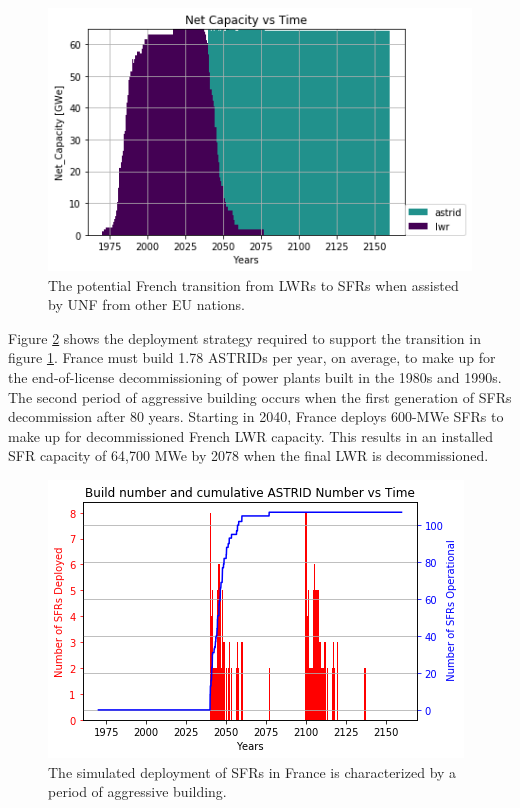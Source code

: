 \begin{figure}[htbp!]
        \begin{center}
                \includegraphics[scale=0.7]{./images/french-transition/power_plot.png}
        \end{center}
        \caption{The potential French transition from \glspl{LWR} to 
                \glspl{SFR} when assisted by \gls{UNF} from other \gls{EU} 
        nations.}
        \label{fig:sfr_num}
\end{figure}

Figure \ref{fig:french_dep} shows the deployment strategy required to support the transition in 
figure \ref{fig:sfr_num}. France must build 1.78 \glspl{ASTRID} per year, on average, to 
make up for the end-of-license decommissioning of power plants built in the 1980s and 1990s.
The second period of aggressive building occurs when the first generation of \glspl{SFR} decommission after 80 years.
Starting in 2040, France deploys 600-\gls{MWe} \glspl{SFR} to make up for 
decommissioned French \gls{LWR} capacity. This results in an installed 
\gls{SFR} 
capacity of 64,700 \gls{MWe} by 2078 when the final \gls{LWR} is 
decommissioned. 



\begin{figure}[htbp!]
    \begin{center}
        \includegraphics[scale=0.7]{./images/french-transition/sfr_deploy.png}
    \end{center}
    \caption{The simulated deployment of \glspl{SFR} in France is characterized by a period of
    aggressive building.}
    \label{fig:french_dep}
\end{figure}


